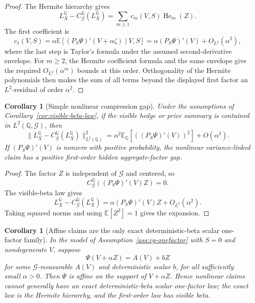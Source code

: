 \documentclass[11pt,a4paper]{amsart}
\theoremstyle{plain}
\newtheorem{corollary}[theorem]{Corollary}
\theoremstyle{definition}
\theoremstyle{remark}
\DeclareMathOperator{\He}{He}
\newcommand{\QQ}{\mathbb{Q}}
\newcommand{\EE}{\mathbb{E}}
\newcommand{\cG}{\mathcal{G}}
\begin{document}
\begin{proof}
The Hermite hierarchy gives
\[
        L_X^\QQ-C_\cG^\QQ(L_X^\QQ)=\sum_{m\ge1}c_m(V,S)\He_m(Z).
\]
The first coefficient is
\[
        c_1(V,S)
        =
        \alpha\EE[(P_S\Psi)'(V+\alpha\zeta)\mid V,S]
        =
        \alpha(P_S\Psi)'(V)+O_{L^2}(\alpha^2),
\]
where the last step is Taylor's formula under the assumed second-derivative envelope.  For
\(m\ge2\), the Hermite coefficient formula and the same envelope give the required
\(O_{L^2}(\alpha^m)\) bounds at this order.  Orthogonality of the Hermite polynomials then makes the
sum of all terms beyond the displayed first factor an \(L^2\)-residual of order \(\alpha^2\).
\end{proof}

\begin{corollary}[Simple nonlinear compression gap]\label{cor:nonlinear-gap-onefactor}
Under the assumptions of Corollary~\ref{cor:visible-beta-law}, if the visible hedge or price
summary is contained in \(L^2(\QQ,\cG)\), then
\[
        \|L_X^\QQ-C_\cG^\QQ(L_X^\QQ)\|_{L^2(\QQ)}^2
        =
        \alpha^2\EE_\QQ[((P_S\Psi)'(V))^2]
        +
        O(\alpha^3).
\]
If \((P_S\Psi)'(V)\) is nonzero with positive probability, the nonlinear variance-linked claim has
a positive first-order hidden aggregate-factor gap.
\end{corollary}

\begin{proof}
The factor \(Z\) is independent of \(\cG\) and centered, so
\[
        C_\cG^\QQ((P_S\Psi)'(V)Z)=0.
\]
The visible-beta law gives
\[
        L_X^\QQ-C_\cG^\QQ(L_X^\QQ)
        =
        \alpha(P_S\Psi)'(V)Z+O_{L^2}(\alpha^2).
\]
Taking squared norms and using \(\EE[Z^2]=1\) gives the expansion.
\end{proof}

\begin{corollary}[Affine claims are the only exact deterministic-beta scalar one-factor family]\label{cor:affine-only}
In the model of Assumption~\ref{ass:cg-onefactor} with \(S=0\) and nondegenerate \(V\), suppose
\[
        \Psi(V+\alpha Z)
        =
        A(V)+bZ
\]
for some \(\cG\)-measurable \(A(V)\) and deterministic scalar \(b\), for all sufficiently small
\(\alpha>0\).  Then \(\Psi\) is affine on the support of \(V+\alpha Z\).  Hence nonlinear claims
cannot generally have an exact deterministic-beta scalar one-factor law; the exact law is the
Hermite hierarchy, and the first-order law has visible beta.
\end{corollary}
\end{document}
